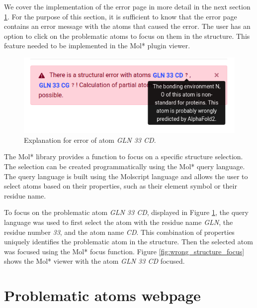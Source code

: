\documentclass[
  digital,     %
  oneside,     %
  nosansbold,  %
  nocolorbold, %
  lof,         %
  lot,         %
]{fithesis4}
\begin{document}
We cover the implementation of the error page in more detail in the next section \ref{}. For the purpose of this section, it is sufficient to know that the error page contains an error message with the atoms that caused the error. The user has an option to click on the problematic atoms to focus on them in the structure. This feature needed to be implemented in the Mol* plugin viewer.


\begin{figure}[htbp]
  \begin{center}
    \includegraphics[width=\textwidth]{figures/wrong_structure_text.png}
  \end{center}
  \caption{Explanation for error of atom \textit{GLN 33 CD}.}
  \label{fig:wrong_structure_text}
\end{figure}

The Mol* library provides a function to focus on a specific structure selection. The selection can be created programmatically using the Mol* query language. The query language is built using the Molscript language \cite{kraulis1991molscript} and allows the user to select atoms based on their properties, such as their element symbol or their residue name.

To focus on the problematic atom \textit{GLN 33 CD}, displayed in Figure \ref{fig:wrong_structure_text}, the query language was used to first select the atom with the residue name \textit{GLN}, the residue number \textit{33}, and the atom name \textit{CD}. This combination of properties uniquely identifies the problematic atom in the structure. Then the selected atom was focused using the Mol* focus function. Figure \ref{fig:wrong_structure_focus} shows the Mol* viewer with the atom \textit{GLN 33 CD} focused.


\section{Problematic atoms webpage}
\end{document}
